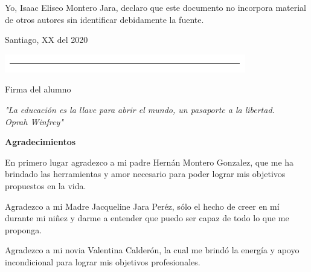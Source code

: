 \documentclass[12pt,a4paper]{article}
\begin{document}
\vspace*{3cm}

Yo, Isaac Eliseo Montero Jara, declaro que este documento no incorpora material de otros autores sin identificar debidamente la fuente. 

\vspace*{4cm}

\begin{flushright}
Santiago, XX del 2020

\vspace{3.5cm}

\includegraphics[scale=0.7]{Figuras/linea.png}

Firma del alumno

\end{flushright}

\pagebreak		%



\vspace*{20cm}

\begin{flushright}

\textit{"La educación es la llave para abrir el mundo, un pasaporte a la libertad.\\ Oprah Winfrey"}

\end{flushright}

\pagebreak %



\begin{large}

\textbf{Agradecimientos}

\end{large}

\vspace*{1cm}

En primero lugar agradezco a mi padre Hernán Montero Gonzalez, que me ha brindado las herramientas y amor necesario para poder lograr mis objetivos propuestos en la vida. 

Agradezco a mi Madre Jacqueline Jara Peréz, sólo el hecho de creer en mí durante mi niñez y darme a entender que puedo ser capaz de todo lo que me proponga.

Agradezco a mi novia Valentina Calderón, la cual me brindó la energía y apoyo incondicional para lograr mis objetivos profesionales. 
\end{document}
